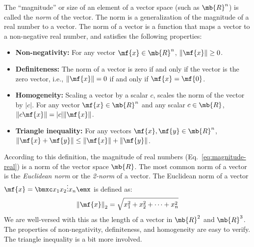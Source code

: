 The ``magnitude'' or size of an element of a vector space (such as $\mb{R}^n$) is called the \textit{norm} of the vector. The norm is a generalization of the magnitude of a real number to a vector. The norm of a vector is a function that maps a vector to a non-negative real number, and satisfies the following properties:
\begin{itemize}
    \item \textbf{Non-negativity:} For any vector $\mf{x} \in \mb{R}^n$, $\norm{\mf{x}} \geq 0$.
    \item \textbf{Definiteness:} The norm of a vector is zero if and only if the vector is the zero vector, i.e., $\norm{\mf{x}} = 0$ if and only if $\mf{x} = \mf{0}$.
    \item \textbf{Homogeneity:} Scaling a vector by a scalar $c$, scales the norm of the vector by $\vert c \vert$. For any vector $\mf{x} \in \mb{R}^n$ and any scalar $c \in \mb{R}$, $\norm{c\mf{x}} = \vert c \vert \norm{\mf{x}}$.
    \item \textbf{Triangle inequality:} For any vectors $\mf{x}, \mf{y} \in \mb{R}^n$, $\norm{\mf{x} + \mf{y}} \leq \norm{\mf{x}} + \norm{\mf{y}}$.
\end{itemize}
According to this definition, the magnitude of real numbers (Eq.~\ref{eq:magnitude-real}) is a norm of the vector space $\mb{R}$. The most common norm of a vector is the \textit{Euclidean norm} or the \textit{2-norm} of a vector. The Euclidean norm of a vector $\mf{x} = \bmxc x_1 \\ x_2 \\ \vdots \\ x_n \emx$ is defined as:
\begin{equation}
    \norm{\mf{x}}_2 = \sqrt{x_1^2 + x_2^2 + \cdots + x_n^2}
    \label{eq:euclidean-norm}
\end{equation}
We are well-versed with this as the length of a vector in $\mb{R}^2$ and $\mb{R}^3$. The properties of non-negativity, definiteness, and homogeneity are easy to verify. The triangle inequality is a bit more involved.

